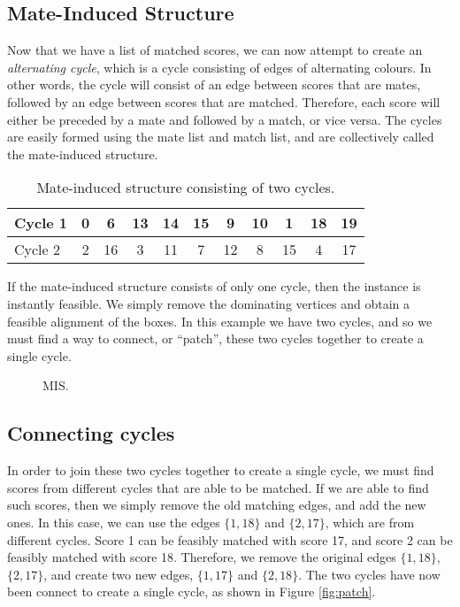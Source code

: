 \documentclass[a4paper, 11pt, twoside, onecolumn, openany]{article}
\begin{document}
\subsection{Mate-Induced Structure}
Now that we have a list of matched scores, we can now attempt to create an \textit{alternating cycle}, which is a cycle consisting of edges of alternating colours. In other words, the cycle will consist of an edge between scores that are mates, followed by an edge between scores that are matched. Therefore, each score will either be preceded by a mate and followed by a match, or vice versa. The cycles are easily formed using the mate list and match list, and are collectively called the mate-induced structure.

\begin{table}[!htb]
	\centering
	\begin{tabular}{|l*{10}{|c}|}
		\hline
		Cycle 1 & 0 & 6 & 13 & 14 & 15 & 9 & 10 & 1 & 18 & 19 \\ \hline
		Cycle 2 & 2 & 16 & 3 & 11 & 7 & 12 & 8 & 15 & 4 & 17 \\
		\hline
	\end{tabular}
	\caption{Mate-induced structure consisting of two cycles.}	
	\label{table:mis}
\end{table}

If the mate-induced structure consists of only one cycle, then the instance is instantly feasible. We simply remove the dominating vertices and obtain a feasible alignment of the boxes. In this example we have two cycles, and so we must find a way to connect, or ``patch'', these two cycles together to create a single cycle.




\begin{figure}[!htb]
	\centering
	
	\caption{MIS.}
	\label{fig:mis}	
\end{figure}



\subsection{Connecting cycles}%
In order to join these two cycles together to create a single cycle, we must find scores from different cycles that are able to be matched. If we are able to find such scores, then we simply remove the old matching edges, and add the new ones. In this case, we can use the edges $\{1,18\}$ and $\{2,17\}$, which are from different cycles. Score 1 can be feasibly matched with score 17, and score 2 can be feasibly matched with score 18. Therefore, we remove the original edges $\{1,18\}$, $\{2,17\}$, and create two new edges, $\{1,17\}$ and $\{2,18\}$. The two cycles have now been connect to create a single cycle, as shown in Figure \ref{fig:patch}.
 
\end{document}
